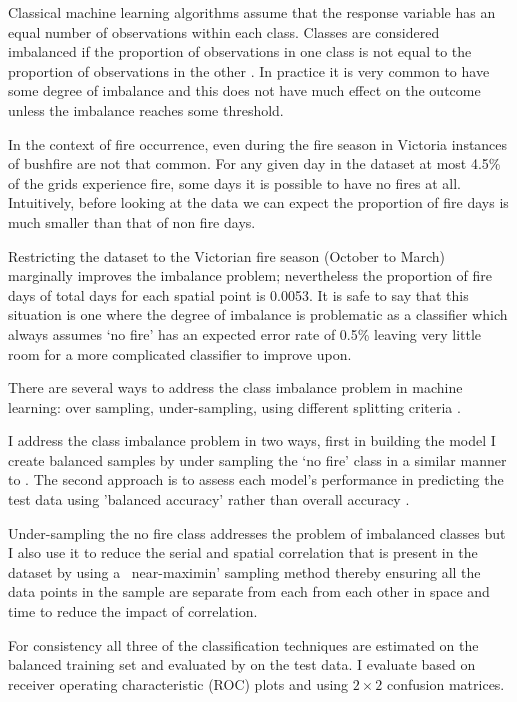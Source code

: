 \documentclass[11pt,a4paper]{article}
\begin{document}
Classical machine learning algorithms assume that the response variable has an equal number of observations within each class. Classes are considered imbalanced if the proportion of observations in one class is not equal to the proportion of observations in the other \citep{japkowicz00}. In practice it is very common to have some degree of imbalance and this does not have much effect on the outcome unless the imbalance reaches some threshold. 

In the context of fire occurrence, even during the fire season in Victoria instances of bushfire are not that common. For any given day in the dataset at most 4.5\% of the grids experience fire, some days it is possible to have no fires at all. Intuitively, before looking at the data we can expect the proportion of fire days is much smaller than that of non fire days. 

Restricting the dataset to the Victorian fire season (October to March) marginally improves the imbalance problem; nevertheless the proportion of fire days of total days for each spatial point is 0.0053. It is safe to say that this situation is one where the degree of imbalance is problematic as a classifier which always assumes `no fire' has an expected error rate of 0.5\% leaving very little room for a more complicated classifier to improve upon. 

There are several ways to address the class imbalance problem in machine learning: over sampling, under-sampling, using different splitting criteria \citep{japkowicz00}. 

I address the class imbalance problem in two ways, first in building the model I create balanced samples by under sampling the `no fire' class in a similar manner to \citep{padilla11}.  The second approach is to assess each model's performance in predicting the test data using 'balanced accuracy' rather than overall accuracy \citep{mosley13, japkowicz00}. 

Under-sampling the no fire class addresses the problem of imbalanced classes but I also use it to reduce the serial and spatial correlation that is present in the dataset by using a ~near-maximin' sampling method thereby ensuring all the data points in the sample are separate from each from each other in space and time to reduce the impact of correlation. 

For consistency all three of the classification techniques are estimated on the balanced training set and evaluated by  on the test data. I evaluate based on receiver operating characteristic (ROC) plots  and using $2\times2$ confusion matrices. 
\end{document}
